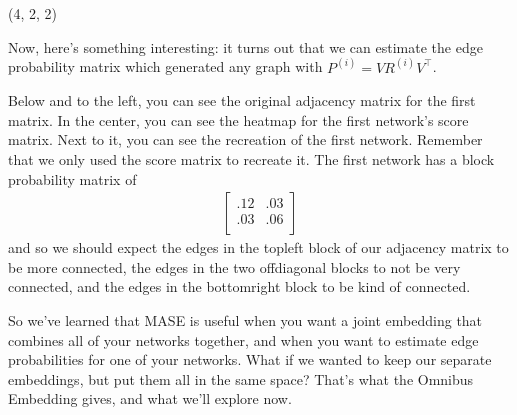 \documentclass[letterpaper,10pt,english]{jupyterBook}
\begin{document}
\begin{sphinxVerbatim}[commandchars=\\\{\}]
  
      
\end{sphinxVerbatim}

\begin{sphinxVerbatim}[commandchars=\\\{\}]
(4, 2, 2)
\end{sphinxVerbatim}

\sphinxAtStartPar
Now, here’s something interesting: it turns out that we can estimate the edge probability matrix which generated any graph with \( P^{(i)} = V R^{(i)} V^\top\).

\begin{sphinxVerbatim}[commandchars=\\\{\}]
    \PYG{p}{[}\PYG{p}{]}  
\end{sphinxVerbatim}

\sphinxAtStartPar
Below and to the left, you can see the original adjacency matrix for the first matrix. In the center, you can see the heatmap for the first network’s score matrix. Next to it, you can see the recreation of the first network. Remember that we only used the score matrix to recreate it. The first network has a block probability matrix of
\label{equation:representations/ch6/multigraph-representation-learning:4e7701b0-7d2e-42da-b41b-e765a9d92127}\begin{align}
\begin{bmatrix}
.12 & .03 \\
.03 & .06 \\
\end{bmatrix}
\end{align}
\sphinxAtStartPar
and so we should expect the edges in the top\sphinxhyphen{}left block of our adjacency matrix to be more connected, the edges in the two off\sphinxhyphen{}diagonal blocks to not be very connected, and the edges in the bottom\sphinxhyphen{}right block to be kind of connected.

\noindent{}

\sphinxAtStartPar
So we’ve learned that MASE is useful when you want a joint embedding that combines all of your networks together, and when you want to estimate edge probabilities for one of your networks. What if we wanted to keep our separate embeddings, but put them all in the same space? That’s what the Omnibus Embedding gives, and what we’ll explore now.
\end{document}

